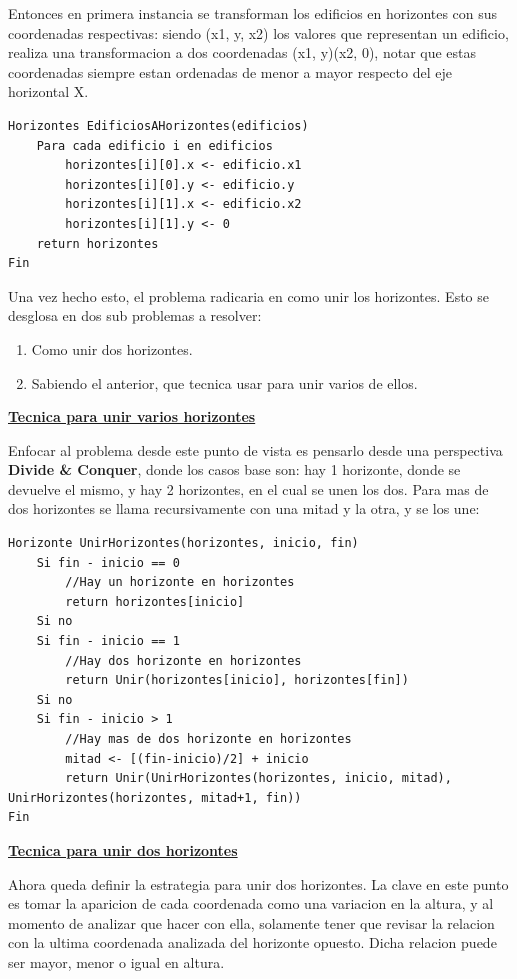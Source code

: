 \documentclass[10pt,a4paper]{article}
\begin{document}
Entonces en primera instancia se transforman los edificios en horizontes con sus coordenadas respectivas: siendo (x1, y, x2) los valores que representan un edificio, realiza una transformacion a dos coordenadas (x1, y)(x2, 0), notar que estas coordenadas siempre estan ordenadas de menor a mayor respecto del eje horizontal X. 

\begin{lstlisting}
Horizontes EdificiosAHorizontes(edificios)
	Para cada edificio i en edificios
		horizontes[i][0].x <- edificio.x1
		horizontes[i][0].y <- edificio.y
		horizontes[i][1].x <- edificio.x2
		horizontes[i][1].y <- 0
	return horizontes
Fin	
\end{lstlisting}

Una vez hecho esto, el problema radicaria en como unir los horizontes. Esto se desglosa en dos sub problemas a resolver:

\begin{enumerate}
\item Como unir dos horizontes.
\item Sabiendo el anterior, que tecnica usar para unir varios de ellos.
\end{enumerate}
\bigskip
\noindent \underline{\textbf{Tecnica para unir varios horizontes}}

Enfocar al problema desde este punto de vista es pensarlo desde una perspectiva \textbf{Divide \& Conquer}, donde los casos base son: hay 1 horizonte, donde se devuelve el mismo, y hay 2 horizontes, en el cual se unen los dos. Para mas de dos horizontes se llama recursivamente con una mitad y la otra, y se los une:

\begin{lstlisting}
Horizonte UnirHorizontes(horizontes, inicio, fin)
	Si fin - inicio == 0
		//Hay un horizonte en horizontes
		return horizontes[inicio]
	Si no
	Si fin - inicio == 1
		//Hay dos horizonte en horizontes
		return Unir(horizontes[inicio], horizontes[fin])
	Si no
	Si fin - inicio > 1
		//Hay mas de dos horizonte en horizontes
		mitad <- [(fin-inicio)/2] + inicio
		return Unir(UnirHorizontes(horizontes, inicio, mitad), UnirHorizontes(horizontes, mitad+1, fin))
Fin	
\end{lstlisting}

\newpage
\noindent \underline{\textbf{Tecnica para unir dos horizontes}}

Ahora queda definir la estrategia para unir dos horizontes. La clave en este punto es tomar la aparicion de cada coordenada como una variacion en la altura, y al momento de analizar que hacer con ella, solamente tener que revisar la relacion con la ultima coordenada analizada del horizonte opuesto. Dicha relacion puede ser mayor, menor o igual en altura. 
\end{document}
